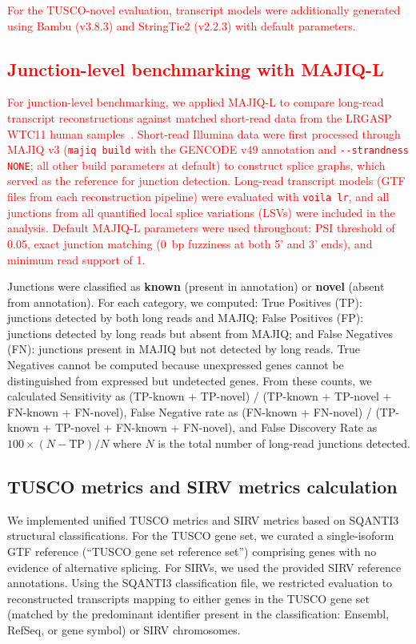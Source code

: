 \documentclass[pdflatex,sn-nature]{sn-jnl}%
\newcommand{\tuscoGeneSet}{TUSCO gene set}
\newcommand{\tuscoMetrics}{TUSCO metrics}
\newcommand{\tuscoNovel}{TUSCO-novel}
\begin{document}
\textcolor{red}{For the \tuscoNovel{} evaluation, transcript models were additionally generated using Bambu (v3.8.3) and StringTie2 (v2.2.3) with default parameters.}

\textcolor{red}{\subsection{Junction-level benchmarking with MAJIQ-L}}

\textcolor{red}{For junction-level benchmarking, we applied MAJIQ-L to compare long-read transcript reconstructions against matched short-read data from the LRGASP WTC11 human samples~\cite{han_contrasting_2024}. Short-read Illumina data were first processed through MAJIQ v3 (\texttt{majiq build} with the GENCODE v49 annotation and \texttt{-{}-strandness NONE}; all other build parameters at default) to construct splice graphs, which served as the reference for junction detection. Long-read transcript models (GTF files from each reconstruction pipeline) were evaluated with \texttt{voila lr}, and all junctions from all quantified local splice variations (LSVs) were included in the analysis. Default MAJIQ-L parameters were used throughout: PSI threshold of 0.05, exact junction matching (0~bp fuzziness at both 5' and 3' ends), and minimum read support of 1.}

Junctions were classified as \textbf{known} (present in annotation) or \textbf{novel} (absent from annotation). For each category, we computed: True Positives (TP): junctions detected by both long reads and MAJIQ; False Positives (FP): junctions detected by long reads but absent from MAJIQ; and False Negatives (FN): junctions present in MAJIQ but not detected by long reads. True Negatives cannot be computed because unexpressed genes cannot be distinguished from expressed but undetected genes. From these counts, we calculated Sensitivity as (TP-known + TP-novel) / (TP-known + TP-novel + FN-known + FN-novel), False Negative rate as (FN-known + FN-novel) / (TP-known + TP-novel + FN-known + FN-novel), and False Discovery Rate as $100 \times (N - \mathrm{TP}) / N$ where $N$ is the total number of long-read junctions detected.
\subsection{\tuscoMetrics{} and SIRV metrics calculation}

We implemented unified \tuscoMetrics{} and SIRV metrics based on SQANTI3 structural classifications. For the \tuscoGeneSet{}, we curated a single-isoform GTF reference (``\tuscoGeneSet{} reference set'') comprising genes with no evidence of alternative splicing. For SIRVs, we used the provided SIRV reference annotations. Using the SQANTI3 classification file, we restricted evaluation to reconstructed transcripts mapping to either genes in the \tuscoGeneSet{} (matched by the predominant identifier present in the classification: Ensembl, RefSeq, or gene symbol) or SIRV chromosomes.
\end{document}
